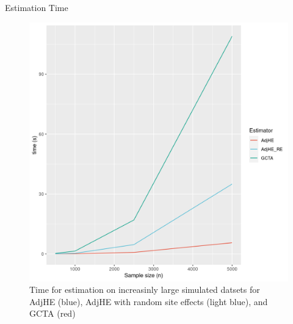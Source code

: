 \documentclass[final]{beamer}
\newlength{\onecolwid}
\begin{document}
\begin{frame}[t]
\begin{columns}[t]
\begin{column}{\onecolwid}
\begin{block}{Estimation Time}
	\begin{figure}
		\includegraphics[width=\textwidth]{Graphics/compare_time.png}
		\caption{\centering
			Time for estimation on increasinly large simulated datsets for AdjHE (blue), AdjHE with random site effects (light blue), and GCTA (red)	
		}
	\end{figure}
\end{block}

\vspace{1in}



\end{column}
\end{columns}
\end{frame}
\end{document}

